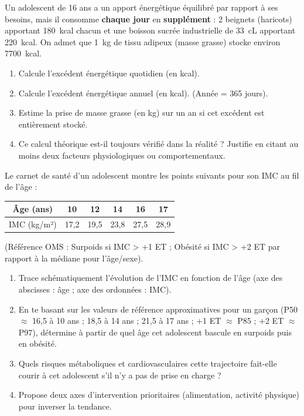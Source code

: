 \documentclass[11pt]{article}
\begin{document}
\begin{exercice}
Un adolescent de 16 ans a un apport énergétique équilibré par rapport à ses besoins, mais il consomme \textbf{chaque jour} en \textbf{supplément} : 2 beignets (haricots) apportant \SI{180}{kcal} chacun et une boisson sucrée industrielle de \SI{33}{cL} apportant \SI{220}{kcal}.
On admet que \SI{1}{kg} de tissu adipeux (masse grasse) stocke environ \SI{7700}{kcal}.
\begin{enumerate}
\item Calcule l'excédent énergétique quotidien (en kcal).
\item Calcule l'excédent énergétique annuel (en kcal). (Année = 365 jours).
\item Estime la prise de masse grasse (en kg) sur un an si cet excédent est entièrement stocké.
\item Ce calcul théorique est-il toujours vérifié dans la réalité ? Justifie en citant au moins deux facteurs physiologiques ou comportementaux.
\end{enumerate}
\end{exercice}

\begin{exercice}
Le carnet de santé d'un adolescent montre les points suivants pour son IMC au fil de l'âge :
\begin{center}
\begin{tabular}{|c|c|c|c|c|c|}\hline
Âge (ans) & 10 & 12 & 14 & 16 & 17 \\ \hline
IMC (kg/m²) & 17,2 & 19,5 & 23,8 & 27,5 & 28,9 \\ \hline
\end{tabular}
\end{center}
(Référence OMS : Surpoids si IMC > +1 ET ; Obésité si IMC > +2 ET par rapport à la médiane pour l'âge/sexe).
\begin{enumerate}
\item Trace schématiquement l'évolution de l'IMC en fonction de l'âge (axe des abscisses : âge ; axe des ordonnées : IMC).
\item En te basant sur les valeurs de référence approximatives pour un garçon (P50 $\approx$ 16,5 à 10 ans ; 18,5 à 14 ans ; 21,5 à 17 ans ; +1 ET $\approx$ P85 ; +2 ET $\approx$ P97), détermine à partir de quel âge cet adolescent bascule en surpoids puis en obésité.
\item Quels risques métaboliques et cardiovasculaires cette trajectoire fait-elle courir à cet adolescent s'il n'y a pas de prise en charge ?
\item Propose deux axes d'intervention prioritaires (alimentation, activité physique) pour inverser la tendance.
\end{enumerate}
\end{exercice}
\end{document}
